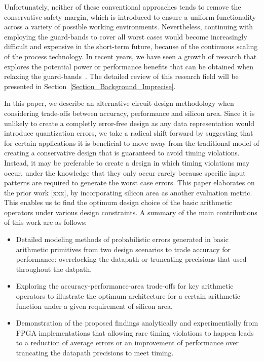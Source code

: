 \documentclass[prodmode,acmtrets]{acmsmall} %
\begin{document}
Unfortunately, neither of these conventional approaches tends to remove the conservative safety margin, which is introduced to ensure a uniform functionality across a variety of possible working environments. Nevertheless, continuing with employing the guard-bands to cover all worst cases would become increasingly difficult and expensive in the short-term future, because of the continuous scaling of the process technology. In recent years, we have seen a growth of research that explores the potential power or performance benefits that can be obtained when relaxing the guard-bands~\cite{NewBox2004}. The detailed review of this research field will be presented in Section~\ref{Section_Background_Imprecise}.

In this paper, we describe an alternative circuit design methodology when considering trade-offs between accuracy, performance and silicon area. Since it is unlikely to create a completly error-free design as any data representation would introduce quantization errors, we take a radical shift forward by suggesting that for certain applications it is beneficial to move away from the traditional model of creating a conservative design that is guaranteed to avoid timing violations. Instead, it may be preferable to create a design in which timing violations may occur, under the knowledge that they only occur rarely because specific input patterns are required to generate the worst case errors. This paper elaborates on the prior work [xxx], by incorporating silicon area as another evaluation metric. This enables us to find the optimum design choice of the basic arithmetic operators under various design constraints. A summary of the main contributions of this work are as follows:

\begin{itemize}
	\item Detailed modeling methods of probabilistic errors generated in basic arithmetic primitives from two design scenarios to trade accuracy for performance: overclocking the datapath or truncating precisions that used throughout the datpath,
	\item Exploring the accuracy-performance-area trade-offs for key arithmetic operators to illustrate the optimum architecture for a certain arithmetic function under a given requirement of silicon area,
	\item Demonstration of the proposed findings analytically and experimentially from FPGA implementations that allowing rare timing violations to happen leads to a reduction of average errors or an improvement of performance over trancating the datapath precisions to meet timing.
\end{itemize}
\end{document}
